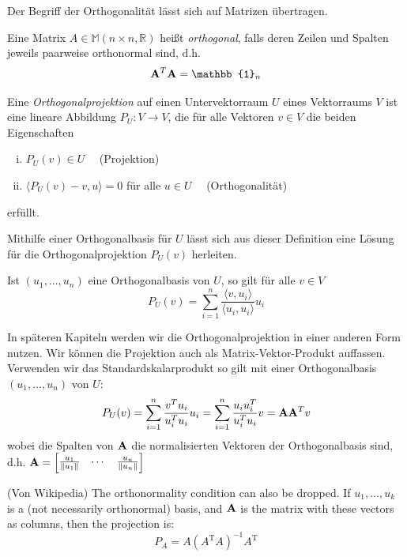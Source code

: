Der Begriff der Orthogonalität lässt sich auf Matrizen übertragen.

\begin{defn}
Eine Matrix $A \in \mathbb{M}(n \times n, \mathbb{R})$ heißt 		\textit{orthogonal}, falls deren Zeilen und Spalten jeweils paarweise orthonormal sind, d.h.
$$\mat A^T \mat A = \mathbb{1}_n$$
\end{defn}

\begin{defn}
Eine \textit{Orthogonalprojektion} auf einen Untervektorraum $U$ eines Vektorraums $V$ ist eine lineare Abbildung $P_U \colon V \rightarrow V$, die für alle Vektoren $v\in V$ die beiden Eigenschaften
\begin{enumerate}[(i)]
\item $P_U(v) \in U \quad$   (Projektion)
\item $\langle P_U(v) - v , u \rangle = 0$ für alle $u \in U \quad$ (Orthogonalität)
\end{enumerate}
erfüllt.
\end{defn}

Mithilfe einer Orthogonalbasis für $U$ lässt sich aus dieser Definition eine Lösung für die Orthogonalprojektion $P_U(v)$ herleiten.

\begin{thm}
Ist $(u_1, \ldots, u_n)$ eine Orthogonalbasis von $U$, so gilt für alle $v \in V$
$$P_{U}(v) = \sum_{i=1}^n \frac{\langle v, u_i \rangle}{\langle u_i, u_i \rangle} u_i$$
\end{thm}

In späteren Kapiteln werden wir die Orthogonalprojektion in einer anderen Form nutzen. Wir können die Projektion auch als Matrix-Vektor-Produkt auffassen. Verwenden wir das Standardskalarprodukt so gilt mit einer Orthogonalbasis $(u_1, \ldots, u_n)$ von $U$:
$$P_U(v) = \sum_{i=1}^n \frac{v^T u_i}{u_i^T u_i} u_i = \sum_{i=1}^n \frac{u_i u_i^T}{u_i^T u_i}v = \mathbf{A} \mathbf{A}^T v$$
wobei die Spalten von $\mathbf{A}$ die normalisierten Vektoren der Orthogonalbasis sind, d.h. $\mathbf{A} = \begin{bmatrix} \frac{u_1}{\left\lVert u_1 \right\rVert} & \cdots & \frac{u_n}{\left\lVert u_n \right\rVert} \end{bmatrix}$

(Von Wikipedia)
The orthonormality condition can also be dropped. If $u_{1},\ldots ,u_{k}$ is a (not necessarily orthonormal) basis, and $\mathbf{A}$ is the matrix with these vectors as columns, then the projection is:
$$P_{A}=A(A^{\mathrm{T}}A)^{-1}A^{\mathrm{T}}$$

